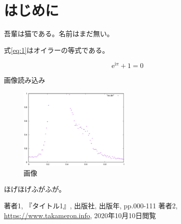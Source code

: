 \documentclass[a4j,uplatex]{jsarticle}
\begin{document}
\section{はじめに}

吾輩は猫である。名前はまだ無い。 

式\ref{eq:1}はオイラーの等式である。

\begin{equation}
  \label{eq:1}
  \mathrm{e}^{\mathrm{i}\pi} + 1 = 0
\end{equation}

画像読み込み
\begin{figure}[H]
    \centering
    \includegraphics[height=4cm]{test.eps}
    \caption{画像}
    \label{fig:1}
\end{figure}

ほげほげ\cite{refer1}ふがふが\cite{refer2}。

\begin{thebibliography}{9}
   著者1, 『タイトル1』, 出版社, 出版年, pp.000-111
   著者2, \url{https://www.takameron.info}, 2020年10月10日閲覧
\end{thebibliography}
\end{document}
